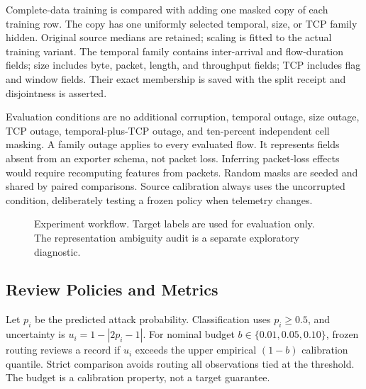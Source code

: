 \documentclass[manuscript,screen,nonacm]{acmart}
\begin{document}
Complete-data training is compared with adding one masked copy of each training row. The copy has one uniformly selected temporal, size, or TCP family hidden. Original source medians are retained; scaling is fitted to the actual training variant. The temporal family contains inter-arrival and flow-duration fields; size includes byte, packet, length, and throughput fields; TCP includes flag and window fields. Their exact membership is saved with the split receipt and disjointness is asserted.

Evaluation conditions are no additional corruption, temporal outage, size outage, TCP outage, temporal-plus-TCP outage, and ten-percent independent cell masking. A family outage applies to every evaluated flow. It represents fields absent from an exporter schema, not packet loss. Inferring packet-loss effects would require recomputing features from packets. Random masks are seeded and shared by paired comparisons. Source calibration always uses the uncorrupted condition, deliberately testing a frozen policy when telemetry changes.

\begin{figure}[t]
\centering
{}
\caption{Experiment workflow. Target labels are used for evaluation only. The representation ambiguity audit is a separate exploratory diagnostic.}
\end{figure}

\subsection{Review Policies and Metrics}
Let $p_i$ be the predicted attack probability. Classification uses $p_i\geq0.5$, and uncertainty is $u_i=1-|2p_i-1|$. For nominal budget $b\in\{0.01,0.05,0.10\}$, frozen routing reviews a record if $u_i$ exceeds the upper empirical $(1-b)$ calibration quantile. Strict comparison avoids routing all observations tied at the threshold. The budget is a calibration property, not a target guarantee.
\end{document}
